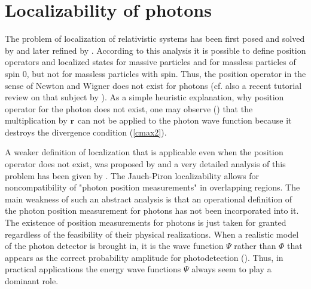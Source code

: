 \documentclass{article}
\begin{document}
\section{Localizability of photons\label{localizability}}

The problem of localization of relativistic systems has been first posed and
solved by \cite{NW_49} and later refined by \cite{Wightman_62}. According to
this analysis it is possible to define position operators and localized
states for massive particles and for massless particles of spin 0, but not
for massless particles with spin. Thus, the position operator in the sense
of Newton and Wigner does not exist for photons (cf. also a recent tutorial
review on that subject by \cite{RS_92}). As a simple heuristic explanation,
why position operator for the photon does not exist, one may observe
(\cite{Pryce_48}) that the multiplication by ${\bf r}$ can not be applied to
the photon wave function because it destroys the divergence condition
(\ref{cmax2}).

A weaker definition of localization that is applicable even when the
position operator does not exist, was proposed by \cite{JP_67} and a very
detailed analysis of this problem has been given by \cite{Amrein_69}. The
Jauch-Piron localizability allows for noncompatibility of "photon position
measurements" in overlapping regions. The main weakness of such an abstract
analysis is that an operational definition of the photon position
measurement for photons has not been incorporated into it. The existence of
position measurements for photons is just taken for granted regardless of
the feasibility of their physical realizations. When a realistic model of
the photon detector is brought in, it is the wave function $\Psi$ rather
than $\Phi$ that appears as the correct probability amplitude for
photodetection (\cite{MW_95}). Thus, in practical applications the energy
wave functions $\Psi$ always seem to play a dominant role.
\end{document}
